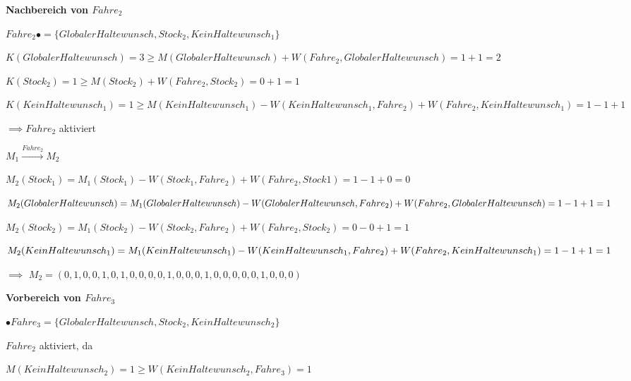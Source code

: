 \documentclass{scrreprt}
\begin{document}
\begin{enumerate}
\textbf{Nachbereich von $Fahre_2$}

\begin{addmargin}[1cm]{0cm}
  $Fahre_2 \bullet = \{ GlobalerHaltewunsch, Stock_2, KeinHaltewunsch_1 \}$

  $K(GlobalerHaltewunsch) = 3 \geq M(GlobalerHaltewunsch) + W(Fahre_2, GlobalerHaltewunsch) = 1 + 1 = 2$ 

  $K(Stock_2) = 1 \geq M(Stock_2) + W(Fahre_2, Stock_2) = 0 + 1 = 1$

  $K(KeinHaltewunsch_1) = 1 \geq M(KeinHaltewunsch_1) - W(KeinHaltewunsch_1, Fahre_2) + W(Fahre_2, KeinHaltewunsch_1) = 1 - 1 + 1$

  $\implies Fahre_2$ aktiviert
\end{addmargin}


$M_1 \xrightarrow{Fahre_2} M_2$

\begin{addmargin}[1cm]{0cm}
  $M_2(Stock_1) = M_1(Stock_1) - W(Stock_1, Fahre_2) + W(Fahre_2, Stock1) = 1 - 1 + 0 = 0$

  $M_2(GlobalerHaltewunsch) = M_1(GlobalerHaltewunsch) - \\ W(GlobalerHaltewunsch, Fahre_2) + \\ W(Fahre_2, GlobalerHaltewunsch) = 1 - 1 + 1 = 1$

  $M_2(Stock_2) = M_1(Stock_2) - W(Stock_2, Fahre_2) + W(Fahre_2, Stock_2) = 0 - 0 + 1 = 1$

  $M_2(KeinHaltewunsch_1) = M_1(KeinHaltewunsch_1) - \\ W(KeinHaltewunsch_1, Fahre_2) + \\ W(Fahre_2, KeinHaltewunsch_1) = 1 - 1 + 1 = 1$

  $\implies$ 
  $M_2 = (
  0, 1, 0, 0, 1, 
  0, 1, 0, 0, 0, 
  0, 1, 0, 0, 0, 
  1, 0, 0, 0, 0, 
  0, 1, 0, 0, 0
  )$
\end{addmargin}


\textbf{Vorbereich von $Fahre_3$}

\begin{addmargin}[1cm]{0cm}
  $\bullet Fahre_3 = \{ GlobalerHaltewunsch, Stock_2, KeinHaltewunsch_2 \}$

  $Fahre_2$ aktiviert, da

  $M(KeinHaltewunsch_2) = 1 \geq W(KeinHaltewunsch_2, Fahre_3) = 1$  


\end{addmargin}
\end{enumerate}
\end{document}
